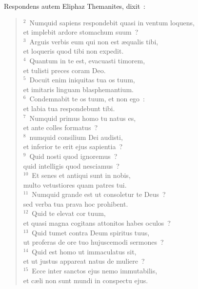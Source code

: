 \lettrine[lines=10,image=true,loversize=0.05,lraise=-0.03]{R}{}espondens autem Eliphaz Themanites, dixit~:
\begin{flushleft}\begin{verse}\vspace{6pt}${}^{2}$~Numquid sapiens respondebit quasi in ventum loquens,\\ et implebit ardore stomachum suum~?\\
${}^{3}$~Arguis verbis eum qui non est \ae qualis tibi,\\ et loqueris quod tibi non expedit.\\
${}^{4}$~Quantum in te est, evacuasti timorem,\\ et tulisti preces coram Deo.\\
${}^{5}$~Docuit enim iniquitas tua os tuum,\\ et imitaris linguam blasphemantium.\\
${}^{6}$~Condemnabit te os tuum, et non ego~:\\ et labia tua respondebunt tibi.\\
${}^{7}$~Numquid primus homo tu natus es,\\ et ante colles formatus~?\\
${}^{8}$~numquid consilium Dei audisti,\\ et inferior te erit ejus sapientia~?\\
${}^{9}$~Quid nosti quod ignoremus~?\\ quid intelligis quod nesciamus~?\\
${}^{10}$~Et senes et antiqui sunt in nobis,\\ multo vetustiores quam patres tui.\\
${}^{11}$~Numquid grande est ut consoletur te Deus~?\\ sed verba tua prava hoc prohibent.\\
${}^{12}$~Quid te elevat cor tuum,\\ et quasi magna cogitans attonitos habes oculos~?\\
${}^{13}$~Quid tumet contra Deum spiritus tuus,\\ ut proferas de ore tuo hujuscemodi sermones~?\\
${}^{14}$~Quid est homo ut immaculatus sit,\\ et ut justus appareat natus de muliere~?\\
${}^{15}$~Ecce inter sanctos ejus nemo immutabilis,\\ et c\ae li non sunt mundi in conspectu ejus.\\

\end{verse}
\end{flushleft}
